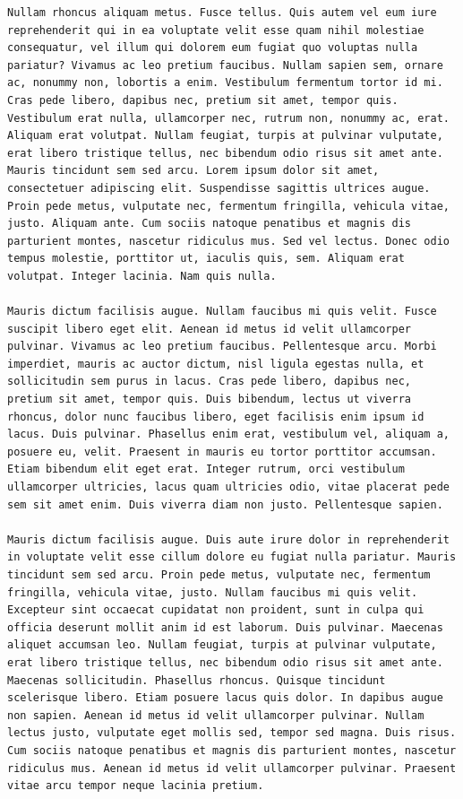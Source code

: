 \documentclass[a4paper, 12pt]{article}
\begin{document}
\begin{verbatim}
Nullam rhoncus aliquam metus. Fusce tellus. Quis autem vel eum iure reprehenderit qui in ea voluptate velit esse quam nihil molestiae consequatur, vel illum qui dolorem eum fugiat quo voluptas nulla pariatur? Vivamus ac leo pretium faucibus. Nullam sapien sem, ornare ac, nonummy non, lobortis a enim. Vestibulum fermentum tortor id mi. Cras pede libero, dapibus nec, pretium sit amet, tempor quis. Vestibulum erat nulla, ullamcorper nec, rutrum non, nonummy ac, erat. Aliquam erat volutpat. Nullam feugiat, turpis at pulvinar vulputate, erat libero tristique tellus, nec bibendum odio risus sit amet ante. Mauris tincidunt sem sed arcu. Lorem ipsum dolor sit amet, consectetuer adipiscing elit. Suspendisse sagittis ultrices augue. Proin pede metus, vulputate nec, fermentum fringilla, vehicula vitae, justo. Aliquam ante. Cum sociis natoque penatibus et magnis dis parturient montes, nascetur ridiculus mus. Sed vel lectus. Donec odio tempus molestie, porttitor ut, iaculis quis, sem. Aliquam erat volutpat. Integer lacinia. Nam quis nulla.

Mauris dictum facilisis augue. Nullam faucibus mi quis velit. Fusce suscipit libero eget elit. Aenean id metus id velit ullamcorper pulvinar. Vivamus ac leo pretium faucibus. Pellentesque arcu. Morbi imperdiet, mauris ac auctor dictum, nisl ligula egestas nulla, et sollicitudin sem purus in lacus. Cras pede libero, dapibus nec, pretium sit amet, tempor quis. Duis bibendum, lectus ut viverra rhoncus, dolor nunc faucibus libero, eget facilisis enim ipsum id lacus. Duis pulvinar. Phasellus enim erat, vestibulum vel, aliquam a, posuere eu, velit. Praesent in mauris eu tortor porttitor accumsan. Etiam bibendum elit eget erat. Integer rutrum, orci vestibulum ullamcorper ultricies, lacus quam ultricies odio, vitae placerat pede sem sit amet enim. Duis viverra diam non justo. Pellentesque sapien.

Mauris dictum facilisis augue. Duis aute irure dolor in reprehenderit in voluptate velit esse cillum dolore eu fugiat nulla pariatur. Mauris tincidunt sem sed arcu. Proin pede metus, vulputate nec, fermentum fringilla, vehicula vitae, justo. Nullam faucibus mi quis velit. Excepteur sint occaecat cupidatat non proident, sunt in culpa qui officia deserunt mollit anim id est laborum. Duis pulvinar. Maecenas aliquet accumsan leo. Nullam feugiat, turpis at pulvinar vulputate, erat libero tristique tellus, nec bibendum odio risus sit amet ante. Maecenas sollicitudin. Phasellus rhoncus. Quisque tincidunt scelerisque libero. Etiam posuere lacus quis dolor. In dapibus augue non sapien. Aenean id metus id velit ullamcorper pulvinar. Nullam lectus justo, vulputate eget mollis sed, tempor sed magna. Duis risus. Cum sociis natoque penatibus et magnis dis parturient montes, nascetur ridiculus mus. Aenean id metus id velit ullamcorper pulvinar. Praesent vitae arcu tempor neque lacinia pretium.


\end{verbatim}
\end{document}
